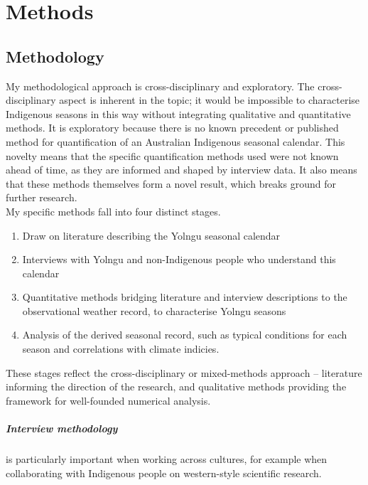 \chapter{Methods}
\label{ch:methods}

\section{Methodology}

My methodological approach is cross-disciplinary and exploratory.
%
The cross-disciplinary aspect is inherent in the topic; it would
be impossible to characterise Indigenous seasons in this way without
integrating qualitative and quantitative methods.
%
It is exploratory because there is no known precedent or published
method for quantification of an Australian Indigenous seasonal calendar.
This novelty means that the specific quantification methods used
were not known ahead of time, as they are informed and shaped by
interview data.  It also means that these methods themselves form
a novel result, which breaks ground for further research.\\

My specific methods fall into four distinct stages.
\begin{enumerate}
\item Draw on literature describing the Yolngu seasonal calendar
\item Interviews with Yolngu and non-Indigenous people who
    understand this calendar
\item Quantitative methods bridging literature and interview
    descriptions to the observational weather record, to characterise
    Yolngu seasons
\item Analysis of the derived seasonal record, such as typical
    conditions for each season and correlations with climate indicies.
\end{enumerate}
These stages reflect the cross-disciplinary or mixed-methods approach --
literature informing the direction of the research, and qualitative
methods providing the framework for well-founded numerical analysis.\\


\paragraph{Interview methodology} is particularly important when working
across cultures, for example when collaborating with Indigenous people
on western-style scientific research.

